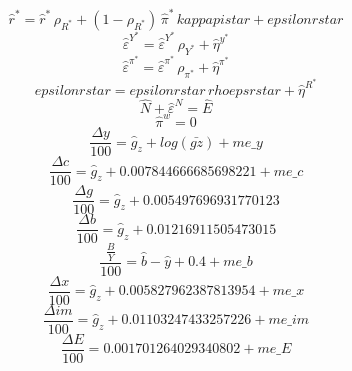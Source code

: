 \begin{dmath}
{\hat{r}^*}={\hat{r}^*}\, {{\rho_{R^*}}}+\left(1-{{\rho_{R^*}}}\right)\, {\hat{\pi}^*}\, {kappapistar}+{epsilonrstar}
\end{dmath}
\begin{dmath}
{\hat{\varepsilon}^{Y^*}}={\hat{\varepsilon}^{Y^*}}\, {{\rho_{Y^*}}}+{\hat{\eta}^{y^*}}
\end{dmath}
\begin{dmath}
{\hat{\varepsilon}^{\pi^*}}={\hat{\varepsilon}^{\pi^*}}\, {{\rho_{\pi^*}}}+{\hat{\eta}^{\pi^*}}
\end{dmath}
\begin{dmath}
{epsilonrstar}={epsilonrstar}\, {rhoepsrstar}+{\hat{\eta}^{R^*}}
\end{dmath}
\begin{dmath}
{\hat{N}}+{\hat{\varepsilon}^N}={\hat{E}}
\end{dmath}
\begin{dmath}
{\hat{\pi}^w}=0
\end{dmath}
\begin{dmath}
\frac{{\Delta{y}}}{100}={{\hat{g}_z}}+log\left({\bar{gz}}\right)+{me\_y}
\end{dmath}
\begin{dmath}
\frac{{\Delta{c}}}{100}={{\hat{g}_z}}+0.007844666685698221+{me\_c}
\end{dmath}
\begin{dmath}
\frac{{\Delta{g}}}{100}={{\hat{g}_z}}+0.005497696931770123
\end{dmath}
\begin{dmath}
\frac{{\Delta{b}}}{100}={{\hat{g}_z}}+0.01216911505473015
\end{dmath}
\begin{dmath}
\frac{{\frac{B}{Y}}}{100}={\hat{b}}-{\hat{y}}+0.4+{me\_b}
\end{dmath}
\begin{dmath}
\frac{{\Delta{x}}}{100}={{\hat{g}_z}}+0.005827962387813954+{me\_x}
\end{dmath}
\begin{dmath}
\frac{{\Delta{im}}}{100}={{\hat{g}_z}}+0.01103247433257226+{me\_im}
\end{dmath}
\begin{dmath}
\frac{{\Delta{E}}}{100}=0.001701264029340802+{me\_E}
\end{dmath}
